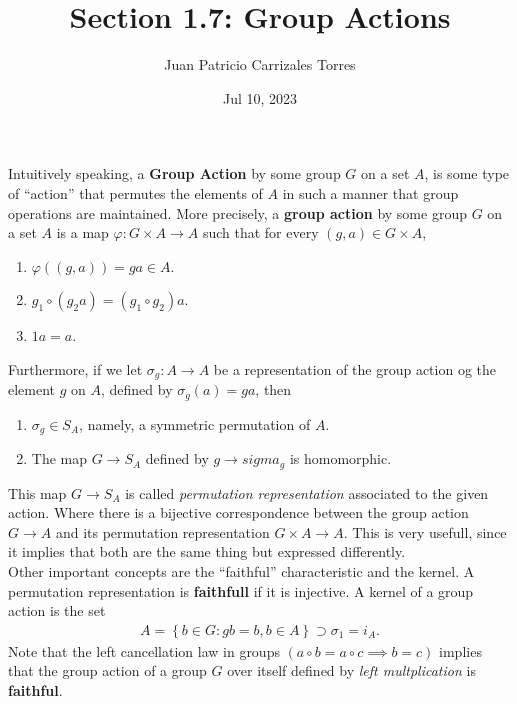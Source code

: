 \documentclass[12pt]{article}
\begin{document}
  
\title{Section 1.7: Group Actions}
   \author{Juan Patricio Carrizales Torres}
     \date{Jul 10, 2023}
       \maketitle

       Intuitively speaking, a \textbf{Group Action} by some group $G$ on a set $A$, is some type of ``action'' that permutes the elements of $A$ in such a manner that group operations are maintained. More precisely, a \textbf{group action} by some group $G$ on a set $A$ is a map $\varphi: G\times A \to A$ such that for every $(g,a)\in G\times A$, 
\begin{enumerate}
  \item $\varphi((g,a)) = ga \in A$.
  \item $g_{1}\circ(g_{2}a) = (g_{1}\circ g_{2})a$.
  \item $1a = a$.
\end{enumerate}
Furthermore, if we let $\sigma_{g}:A\to A$ be a representation of the group action og the element $g$ on $A$, defined by $\sigma_{g}(a) = ga$, then 
\begin{enumerate}
  \item $\sigma_{g} \in S_{A}$, namely, a symmetric permutation of $A$.
  \item The map $G\to S_{A}$ defined by $g \to sigma_{g}$ is homomorphic.
\end{enumerate}
This map $G\to S_{A}$ is called \textit{permutation representation} associated to the given action. Where there is a bijective correspondence between the group action  $G\to A$ and its permutation representation $G\times A \to A$. This is very usefull, since it implies that both are the same thing but expressed differently.\\

Other important concepts are the ``faithful'' characteristic and the kernel. A permutation representation is \textbf{faithfull} if it is injective. A kernel of a group action is the set
\begin{align*}
  A = \left\{ b\in G :  gb = b, b\in A\right\} \supset \sigma_{1} = i_{A}.
\end{align*}
Note that the left cancellation law in groups $(a\circ b = a\circ c \implies b=c)$ implies that the group action of a group $G$ over itself defined by \textit{left multplication} is \textbf{faithful}.
       
\end{document}
